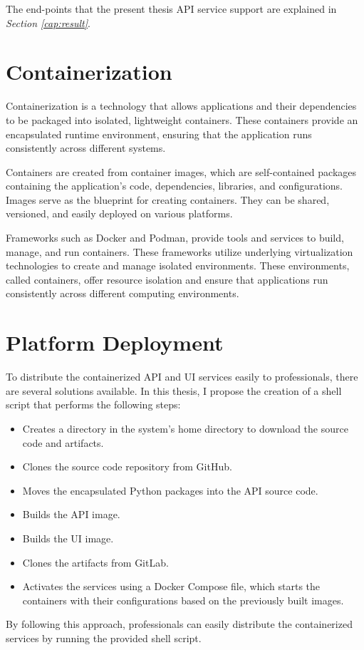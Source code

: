 The end-points that the present thesis API service support are explained in
\textit{Section \ref{cap:result}}.

\section{Containerization}

Containerization is a technology that allows applications and their
dependencies to be packaged into isolated, lightweight containers. These
containers provide an encapsulated runtime environment, ensuring that the
application runs consistently across different systems. \newline

Containers are created from container images, which are self-contained packages
containing the application's code, dependencies, libraries, and configurations.
Images serve as the blueprint for creating containers. They can be shared,
versioned, and easily deployed on various platforms. \newline

Frameworks such as Docker and Podman, provide tools and services to build,
manage, and run containers. These frameworks utilize underlying virtualization
technologies to create and manage isolated environments. These environments,
called containers, offer resource isolation and ensure that applications run
consistently across different computing environments.

\section{Platform Deployment}

To distribute the containerized API and UI services easily to professionals,
there are several solutions available. In this thesis, I propose the creation
of a shell script that performs the following steps:

\begin{itemize}
  \item Creates a directory in the system's home directory to download the source code and artifacts.
  \item Clones the source code repository from GitHub.
  \item Moves the encapsulated Python packages into the API source code.
  \item Builds the API image.
  \item Builds the UI image.
  \item Clones the artifacts from GitLab.
  \item Activates the services using a Docker Compose file, which starts the containers with their configurations based on the previously built images.
\end{itemize}

By following this approach, professionals can easily distribute the
containerized services by running the provided shell script.
